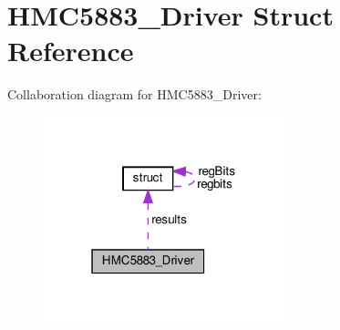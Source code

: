\hypertarget{structHMC5883__Driver}{}\section{H\+M\+C5883\+\_\+\+Driver Struct Reference}
\label{structHMC5883__Driver}


Collaboration diagram for H\+M\+C5883\+\_\+\+Driver\+:\nopagebreak
\begin{figure}[H]
\begin{center}
\leavevmode
\includegraphics[width=199pt]{structHMC5883__Driver__coll__graph}
\end{center}
\end{figure}
